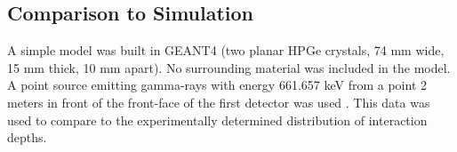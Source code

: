 \subsection*{Comparison to Simulation}

A simple model was built in GEANT4 (two planar HPGe crystals, 74 mm wide, 15 mm thick, 10 mm apart). No surrounding material was included in the model. A point source emitting gamma-rays with energy 661.657 keV from a point 2 meters in front of the front-face of the first detector was used \cite{ebss}. This data was used to compare to the experimentally determined distribution of interaction depths.